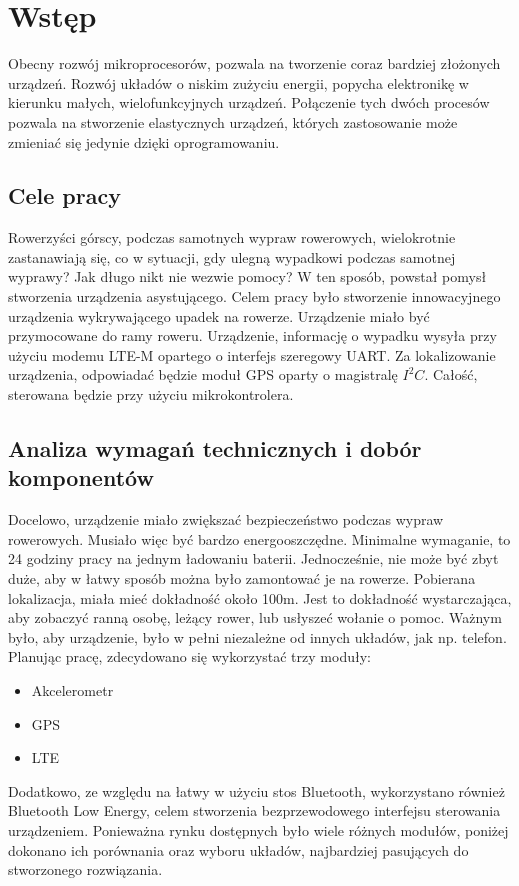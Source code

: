 \chapter{Wstęp}
\label{cha:wstep}

Obecny rozwój mikroprocesorów, pozwala na tworzenie coraz bardziej złożonych urządzeń. Rozwój układów o niskim zużyciu energii, popycha elektronikę w kierunku małych, wielofunkcyjnych urządzeń. Połączenie tych dwóch procesów pozwala na stworzenie elastycznych urządzeń, których zastosowanie może zmieniać się jedynie dzięki oprogramowaniu.


\section{Cele pracy}
\label{sec:celePracy}

Rowerzyści górscy, podczas samotnych wypraw rowerowych, wielokrotnie zastanawiają się, co w sytuacji, gdy ulegną wypadkowi podczas samotnej wyprawy?
Jak długo nikt nie wezwie pomocy? W ten sposób, powstał pomysł stworzenia urządzenia asystującego.
\newline
Celem pracy było stworzenie innowacyjnego urządzenia wykrywającego upadek na rowerze. Urządzenie miało być przymocowane do ramy roweru. Urządzenie, informację o wypadku wysyła przy użyciu modemu LTE-M opartego o interfejs szeregowy UART. Za lokalizowanie urządzenia, odpowiadać będzie moduł GPS oparty o magistralę $I^{2}C$. Całość, sterowana będzie przy użyciu mikrokontrolera.

\section{Analiza wymagań technicznych i dobór komponentów}

Docelowo, urządzenie miało zwiększać bezpieczeństwo podczas wypraw rowerowych. Musiało więc być bardzo energooszczędne. Minimalne wymaganie, to 24 godziny pracy na jednym ładowaniu baterii. Jednocześnie, nie może być zbyt duże, aby w łatwy sposób można było zamontować je na rowerze. Pobierana lokalizacja, miała mieć dokładność około 100m. Jest to dokładność wystarczająca, aby zobaczyć ranną osobę, leżący rower, lub usłyszeć wołanie o pomoc. Ważnym było, aby urządzenie, było w pełni niezależne od innych układów, jak np. telefon.
\newline
Planując pracę, zdecydowano się wykorzystać trzy moduły:
\begin{itemize}
    \item Akcelerometr
    \item GPS
    \item LTE
\end{itemize}
Dodatkowo, ze względu na łatwy w użyciu stos Bluetooth, wykorzystano również Bluetooth Low Energy, celem stworzenia bezprzewodowego interfejsu sterowania urządzeniem.
\newline
Ponieważna rynku dostępnych było wiele różnych modułów, poniżej dokonano ich porównania oraz wyboru układów, najbardziej pasujących do stworzonego rozwiązania.

